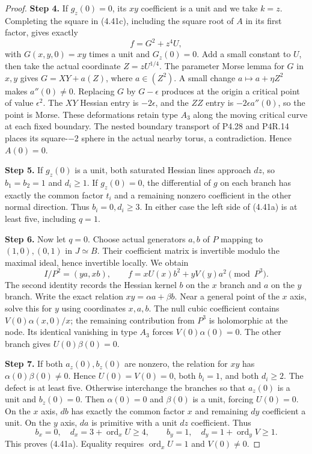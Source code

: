 \begin{proof}
\noindent\textbf{Step 4.} If $g_z(0)=0$, its $xy$ coefficient is a unit and we take
$k=z$. Completing the square in (4.41c), including the
square root of $A$ in its first factor, gives exactly
\[
                         f=G^2+z^4U,
\]
with $G(x,y,0)=xy$ times a unit and $G_z(0)=0$.
Add a small constant to $U$, then take the actual coordinate
$Z=zU^{1/4}$. The parameter Morse lemma for $G$ in $x,y$
gives $G=XY+a(Z)$, where $a\in(Z^2)$. A small change
$a\mapsto a+\eta Z^2$ makes $a''(0)\ne0$. Replacing
$G$ by $G-\epsilon$ produces at the origin a critical point
of value $\epsilon^2$. The $XY$ Hessian entry is
$-2\epsilon$, and the $ZZ$ entry is
$-2\epsilon a''(0)$, so the point is Morse.
These deformations retain type $A_3$ along the moving
critical curve at each fixed boundary. The nested boundary
transport of P4.28 and P4R.14 places its square-$-2$ sphere
in the actual nearby torus, a contradiction. Hence $A(0)=0$.

\noindent\textbf{Step 5.} If $g_z(0)$ is a unit, both saturated Hessian lines approach
$dz$, so $b_1=b_2=1$ and $d_i\ge1$. If $g_z(0)=0$,
the differential of $g$ on each branch has exactly the
common factor $t_i$ and a remaining nonzero coefficient
in the other normal direction. Thus $b_i=0,d_i\ge3$.
In either case the left side of (4.41a) is at least five,
including $q=1$.

\noindent\textbf{Step 6.} Now let $q=0$. Choose actual generators $a,b$ of $P$ mapping
to $(1,0),(0,1)$ in $J\simeq B$. Their coefficient matrix
is invertible modulo the maximal ideal, hence invertible
locally. We obtain
\[
 I/P^2=(ya,xb),\qquad
 f=xU(x)b^2+yV(y)a^2\pmod {P^3}.                      \tag{4.41d}
\]
The second identity records the Hessian kernel $b$ on the
$x$ branch and $a$ on the $y$ branch. Write the exact
relation $xy=\alpha a+\beta b$. Near a general point of
the $x$ axis, solve this for $y$ using coordinates $x,a,b$.
The null cubic coefficient contains
$V(0)\alpha(x,0)/x$; the remaining contribution from
$P^3$ is holomorphic at the node. Its identical vanishing
in type $A_3$ forces $V(0)\alpha(0)=0$. The other branch
gives $U(0)\beta(0)=0$.

\noindent\textbf{Step 7.} If both $a_z(0),b_z(0)$ are nonzero, the relation for $xy$
has $\alpha(0)\beta(0)\ne0$. Hence $U(0)=V(0)=0$,
both $b_i=1$, and both $d_i\ge2$. The defect is at least
five. Otherwise interchange the branches so that $a_z(0)$
is a unit and $b_z(0)=0$. Then $\alpha(0)=0$ and
$\beta(0)$ is a unit, forcing $U(0)=0$. On the $x$ axis,
$db$ has exactly the common factor $x$ and remaining
$dy$ coefficient a unit. On the $y$ axis, $da$ is primitive
with a unit $dz$ coefficient. Thus
\[
 b_x=0,\quad d_x=3+\operatorname{ord}_xU\ge4,
 \qquad
 b_y=1,\quad d_y=1+\operatorname{ord}_yV\ge1.
\]
This proves (4.41a). Equality requires
$\operatorname{ord}_xU=1$ and $V(0)\ne0$.


\end{proof}
